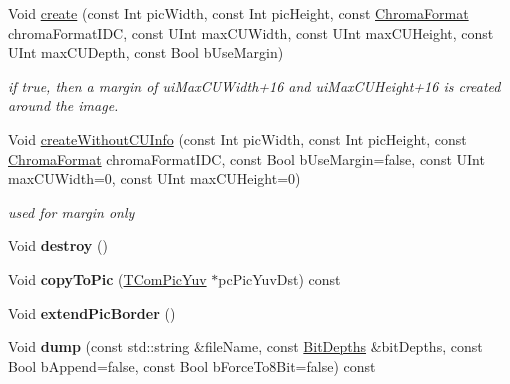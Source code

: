 \begin{DoxyCompactItemize}
\item 
Void \hyperlink{class_t_com_pic_yuv_a87b6364902cae5bd0284aa59087c2892}{create} (const Int pic\+Width, const Int pic\+Height, const \hyperlink{_type_def_8h_a4a6c51c10f2eb04abc7209db7caff39f}{Chroma\+Format} chroma\+Format\+I\+DC, const U\+Int max\+C\+U\+Width, const U\+Int max\+C\+U\+Height, const U\+Int max\+C\+U\+Depth, const Bool b\+Use\+Margin)
\begin{DoxyCompactList}\small\item\em if true, then a margin of ui\+Max\+C\+U\+Width+16 and ui\+Max\+C\+U\+Height+16 is created around the image. \end{DoxyCompactList}\item 
Void \hyperlink{class_t_com_pic_yuv_aef6e9501bd6200dbd134a6b8b8c16057}{create\+Without\+C\+U\+Info} (const Int pic\+Width, const Int pic\+Height, const \hyperlink{_type_def_8h_a4a6c51c10f2eb04abc7209db7caff39f}{Chroma\+Format} chroma\+Format\+I\+DC, const Bool b\+Use\+Margin=false, const U\+Int max\+C\+U\+Width=0, const U\+Int max\+C\+U\+Height=0)
\begin{DoxyCompactList}\small\item\em used for margin only \end{DoxyCompactList}\item 
\mbox{\label{class_t_com_pic_yuv_a8b4f135fdff26e4deb0c54fc8737c9a4}} 
Void {\bfseries destroy} ()
\item 
\mbox{\label{class_t_com_pic_yuv_a3a9c08511910de048186398e5348955f}} 
Void {\bfseries copy\+To\+Pic} (\hyperlink{class_t_com_pic_yuv}{T\+Com\+Pic\+Yuv} $\ast$pc\+Pic\+Yuv\+Dst) const
\item 
\mbox{\label{class_t_com_pic_yuv_a21cc41802db4f9298827cc93ce7d9e3c}} 
Void {\bfseries extend\+Pic\+Border} ()
\item 
\mbox{\label{class_t_com_pic_yuv_a1df0556dccd2bd65942958016974ff6c}} 
Void {\bfseries dump} (const std\+::string \&file\+Name, const \hyperlink{struct_bit_depths}{Bit\+Depths} \&bit\+Depths, const Bool b\+Append=false, const Bool b\+Force\+To8\+Bit=false) const
\item 
\mbox{\label{class_t_com_pic_yuv_a95855be57b5caa2d2f7bdfd13f2a30b3}} 

\end{DoxyCompactItemize}

